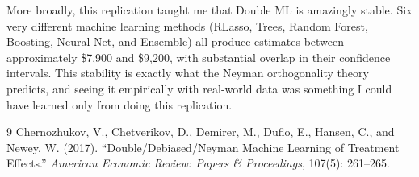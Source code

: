 \documentclass[12pt]{article}
\begin{document}
More broadly, this replication taught me that Double ML is amazingly stable.
Six very different machine learning methods (RLasso, Trees, Random Forest,
Boosting, Neural Net, and Ensemble) all produce estimates between
approximately \$7,900 and \$9,200, with substantial overlap in their
confidence intervals. This stability is exactly what the Neyman orthogonality
theory predicts, and seeing it empirically with real-world data was something
I could have learned only from doing this replication.

\begin{thebibliography}{9}
Chernozhukov, V., Chetverikov, D., Demirer, M., Duflo, E., Hansen, C.,
and Newey, W. (2017). ``Double/Debiased/Neyman Machine Learning of
Treatment Effects.'' \textit{American Economic Review: Papers \&
Proceedings}, 107(5): 261--265.
\end{thebibliography}
\end{document}
